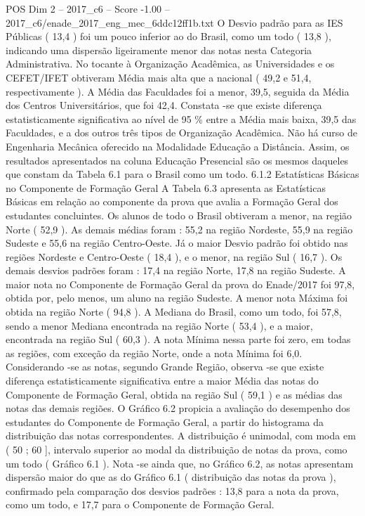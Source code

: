 \begin{textsample}{POS Dim 2 – 2017\_c6 – Score -1.00 – 2017\_c6/enade\_2017\_eng\_mec\_6ddc12ff1b.txt}
O Desvio padrão para as IES Públicas ( 13,4 ) foi um pouco inferior ao do Brasil, como um todo ( 13,8 ), indicando uma dispersão ligeiramente menor das notas nesta Categoria Administrativa.
No tocante à Organização Acadêmica, as Universidades e os CEFET/IFET obtiveram Média mais alta que a nacional ( 49,2 e 51,4, respectivamente ).
A Média das Faculdades foi a menor, 39,5, seguida da Média dos Centros Universitários, que foi 42,4.
Constata -se que existe diferença estatisticamente significativa ao nível de 95 \% entre a Média mais baixa, 39,5 das Faculdades, e a dos outros três tipos de Organização Acadêmica.
Não há curso de Engenharia Mecânica oferecido na Modalidade Educação a Distância.
Assim, os resultados apresentados na coluna Educação Presencial são os mesmos daqueles que constam da Tabela 6.1 para o Brasil como um todo. 6.1.2 Estatísticas Básicas no Componente de Formação Geral A Tabela 6.3 apresenta as Estatísticas Básicas em relação ao componente da prova que avalia a Formação Geral dos estudantes concluintes.
Os alunos de todo o Brasil obtiveram a menor, na região Norte ( 52,9 ).
As demais médias foram : 55,2 na região Nordeste, 55,9 na região Sudeste e 55,6 na região Centro-Oeste.
Já o maior Desvio padrão foi obtido nas regiões Nordeste e Centro-Oeste ( 18,4 ), e o menor, na região Sul ( 16,7 ).
Os demais desvios padrões foram : 17,4 na região Norte, 17,8 na região Sudeste.
A maior nota no Componente de Formação Geral da prova do Enade/2017 foi 97,8, obtida por, pelo menos, um aluno na região Sudeste.
A menor nota Máxima foi obtida na região Norte ( 94,8 ).
A Mediana do Brasil, como um todo, foi 57,8, sendo a menor Mediana encontrada na região Norte ( 53,4 ), e a maior, encontrada na região Sul ( 60,3 ).
A nota Mínima nessa parte foi zero, em todas as regiões, com exceção da região Norte, onde a nota Mínima foi 6,0.
Considerando -se as notas, segundo Grande Região, observa -se que existe diferença estatisticamente significativa entre a maior Média das notas do Componente de Formação Geral, obtida na região Sul ( 59,1 ) e as médias das notas das demais regiões.
O Gráfico 6.2 propicia a avaliação do desempenho dos estudantes do Componente de Formação Geral, a partir do histograma da distribuição das notas correspondentes.
A distribuição é unimodal, com moda em ( 50 ; 60 ], intervalo superior ao modal da distribuição de notas da prova, como um todo ( Gráfico 6.1 ).
Nota -se ainda que, no Gráfico 6.2, as notas apresentam dispersão maior do que as do Gráfico 6.1 ( distribuição das notas da prova ), confirmado pela comparação dos desvios padrões : 13,8 para a nota da prova, como um todo, e 17,7 para o Componente de Formação Geral.

\end{textsample}
